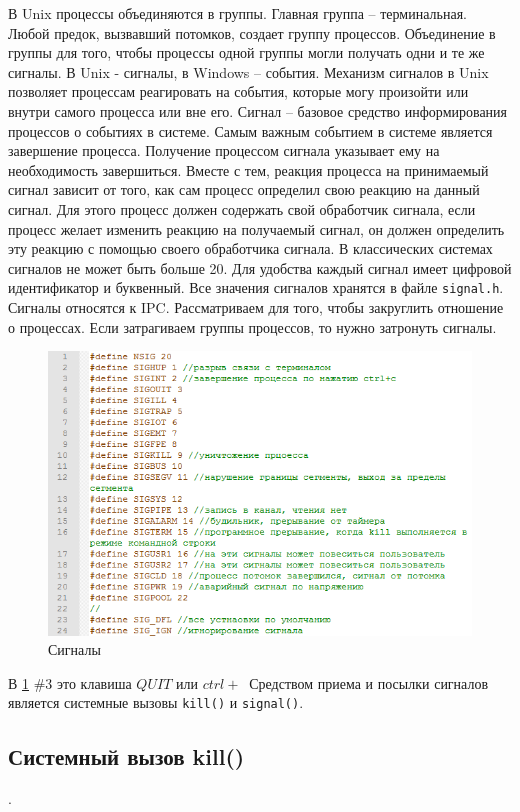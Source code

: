 В Unix процессы объединяются в группы. Главная группа – терминальная. Любой предок, вызвавший потомков, создает группу процессов. Объединение в группы для того, чтобы процессы одной группы могли получать одни и те же сигналы.
В Unix - сигналы, в Windows – события. Механизм сигналов в Unix позволяет процессам реагировать на события, которые могу произойти или внутри самого процесса или вне его. Сигнал – базовое средство информирования процессов о событиях в системе.
Самым важным событием в системе является завершение процесса. Получение процессом сигнала указывает ему на необходимость завершиться.  Вместе с тем, реакция процесса на принимаемый сигнал зависит от того, как сам процесс определил свою реакцию на данный сигнал. Для этого процесс должен содержать свой обработчик сигнала, если процесс желает изменить реакцию на получаемый сигнал, он должен определить эту реакцию с помощью своего обработчика сигнала. В классических системах сигналов не может быть больше 20. Для удобства каждый сигнал имеет цифровой идентификатор и буквенный. Все значения сигналов хранятся в файле \verb|signal.h|. 
Сигналы относятся к IPC. Рассматриваем для того, чтобы закруглить отношение о процессах. Если затрагиваем группы процессов, то нужно затронуть сигналы. 

\begin{figure}[H]
	\centering
	\includegraphics[width=\textwidth]{pic/5.png}
	\caption{Сигналы}
	\label{listing:signals}
\end{figure}

В \ref{listing:signals} \#3 это клавиша $QUIT$ или $ctrl + \ $
Средством приема и посылки сигналов является системные вызовы \verb|kill()| и \verb|signal()|.

\subsection{Системный вызов kill()}.

